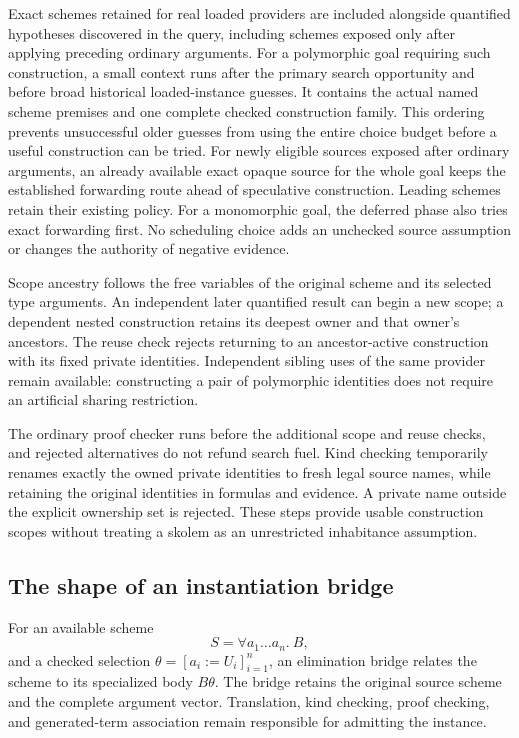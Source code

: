 \documentclass[11pt]{article}
\begin{document}
Exact schemes retained for real loaded providers are included alongside
quantified hypotheses discovered in the query, including schemes exposed
only after applying preceding ordinary arguments. For a polymorphic goal
requiring such construction, a small context runs after the primary search
opportunity and before broad historical loaded-instance guesses. It
contains the actual named scheme premises and one complete checked
construction family. This ordering prevents unsuccessful older guesses from
using the entire choice budget before a useful construction can be tried.
For newly eligible sources exposed after ordinary arguments, an already
available exact opaque source for the whole goal keeps the established
forwarding route ahead of speculative construction. Leading schemes retain
their existing policy. For a monomorphic goal, the deferred phase also tries
exact forwarding first.
No scheduling choice adds an unchecked source
assumption or changes the authority of negative evidence.

Scope ancestry follows the free variables of the original scheme and its
selected type arguments. An independent later quantified result can begin a
new scope; a dependent nested construction retains its deepest owner and that
owner's ancestors. The reuse check rejects returning to an ancestor-active
construction with its fixed private identities. Independent sibling uses of
the same provider remain available: constructing a pair of polymorphic
identities does not require an artificial sharing restriction.

The ordinary proof checker runs before the additional scope and reuse checks,
and rejected alternatives do not refund search fuel. Kind checking temporarily
renames exactly the owned private identities to fresh legal source names,
while retaining the original identities in formulas and evidence. A private
name outside the explicit ownership set is rejected. These steps provide
usable construction scopes without treating a skolem as an unrestricted
inhabitance assumption.

\subsection{The shape of an instantiation bridge}

For an available scheme
\[
 S = \forall a_1\ldots a_n.\ B,
\]
and a checked selection $\theta = [a_i := U_i]_{i=1}^{n}$, an elimination
bridge relates the scheme to its specialized body $B\theta$. The bridge
retains the original source scheme and the complete argument vector.
Translation, kind checking, proof checking, and generated-term association
remain responsible for admitting the instance.
\end{document}
